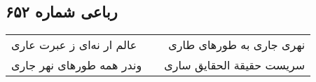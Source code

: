 \begin{center}
\section*{رباعی شماره ۶۵۲}
\label{sec:sh652}
\begin{longtable}{l p{0.5cm} r}
عالم ار نه‌ای ز عبرت عاری
&&
نهری جاری به طورهای طاری
\\
وندر همه طورهای نهر جاری
&&
سریست حقیقة الحقایق ساری
\\
\end{longtable}
\end{center}
